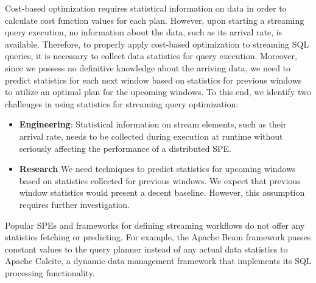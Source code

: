 Cost-based optimization requires statistical information on data in order to calculate cost function values for each plan. However, upon starting a streaming query execution, no information about the data, such as its arrival rate, is available. 
Therefore, to properly apply cost-based optimization to streaming SQL queries, it is necessary to collect data statistics for query execution. 
Moreover, since we possess no definitive knowledge about the arriving data, we need to predict statistics for each next window based on statistics for previous windows to utilize an optimal plan for the upcoming windows. To this end, we identify two challenges in using statistics for streaming query optimization:

\begin{itemize}
    \item \textbf{Engineering}:
    Statistical information on stream elements, such as their arrival rate, needs to be collected during execution at runtime without seriously affecting the performance of a distributed SPE. %
    \item \textbf{Research}
We need techniques to predict statistics for upcoming windows based on statistics collected for previous windows.    
We expect that previous window statistics would present a decent baseline. 
However, this assumption requires further investigation. 
\end{itemize}

Popular SPEs and frameworks for defining streaming workflows do not offer any statistics fetching or predicting. 
For example, the Apache Beam framework passes constant values to the query planner instead of any actual data statistics to
 Apache Calcite, a dynamic data management framework that implements its SQL processing functionality.

